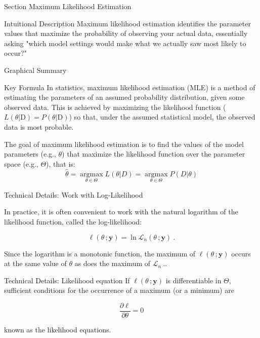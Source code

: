 
\begin{frame}{Section}
\centering
\Huge{Maximum Likelihood Estimation}
\end{frame}


\begin{frame}{Intuitional Description}
Maximum likelihood estimation identifies the parameter values that maximize the probability of observing your actual data, essentially asking "which model settings would make what we actually saw most likely to occur?"
\end{frame}

\begin{frame}{Graphical Summary}

\end{frame}


\begin{frame}{Key Formula}
In statistics, maximum likelihood estimation (MLE) is a method of estimating the parameters of an assumed probability distribution, given some observed data. This is achieved by maximizing the likelihood function ($L(\theta|\text{D}) = P(\theta|\text{D})$) so that, under the assumed statistical model, the observed data is most probable. 

The goal of maximum likelihood estimation is to find the values of the model parameters (e.g., $\theta$) that maximize the likelihood function over the parameter space (e.g., $\Theta$), that is:
$$
\hat{\theta} = \underset{\theta \in \Theta}{\operatorname{argmax}} L(\theta|D) = \underset{\theta \in \Theta}{\operatorname{argmax}} P(D|\theta)
$$
\end{frame}


\begin{frame}{Technical Details: Work with Log-Likelihood}

In practice, it is often convenient to work with the natural logarithm of the likelihood function, called the log-likelihood:

$$\ell (\theta \,;\mathbf{y})=\ln {\mathcal{L}}_{n}(\theta \,;\mathbf{y})~.$$

Since the logarithm is a monotonic function, the maximum of $\ell (\theta \,;\mathbf{y})$ occurs at the same value of $\theta$ as does the maximum of ${\mathcal{L}}_{n}~.$.

\end{frame}

\begin{frame}{Technical Details: Likelihood equation}
If $\ell (\theta \,;\mathbf{y})$ is differentiable in $\Theta$, sufficient conditions for the occurrence of a maximum (or a minimum) are

$$
\frac{\partial \ell}{\partial \theta}=0
$$

known as the likelihood equations.

\end{frame}

